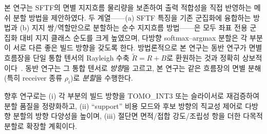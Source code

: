 \documentclass[11pt,a4paper]{article}
\begin{document}
본 연구는 SFTF의 면별 지지흐름 물리량을 보존하여
출력 적합성을 직접 반영하는 메쉬 분할 방법을 제안하였다.
두 계열——(a) SFTF 특징을 기존 군집화에 융합하는 방법과
(b) 지지 쌍/역할만으로 분할하는 순수 지지흐름 방법——은
모두 좌표 전용 군집화 대비 지지 클래스 순도를 크게 높였으며,
다방향 softmax--argmax 분할은 각 부분이 서로 다른 좋은 빌드 방향을 갖도록 한다.
방법론적으로 본 연구는 동반 연구가 면별 흐름장을 단일 통합 텐서의 Rayleigh 수축
$\tilde R=R+B$로 환원하는 것과 정확히 상보적이다~\cite{sftf}.
동반 연구는 그 통합 텐서로 \emph{방향}을 고르고, 본 연구는 같은 흐름장의 면별 분해(특히 receiver 종류 $\rho_i$)로 \emph{분할}을 수행한다.

향후 연구로는 (i) 각 부분의 빌드 방향을 TOMO\_INT3 또는 슬라이서로 재검증하여
분할 품질을 정량화하고,
(ii) ``support'' 비용 모드와 후보 방향의 직교성 제어로 다방향 분할의 방향 다양성을 높이며,
(iii) 절단면 면적/접합 강도/조립성 항을 더한 다목적 분할로 확장할 계획이다.

\nocite{dbscan,kmedoids}


\end{document}
